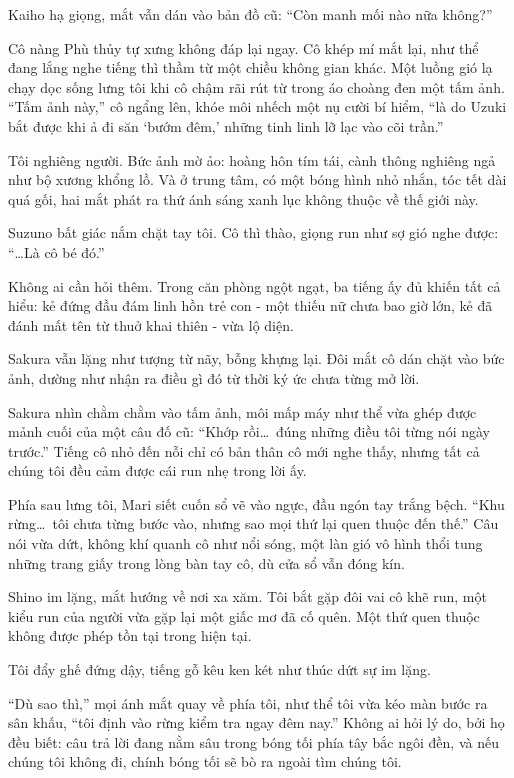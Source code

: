 \documentclass[../main.tex]{subfiles}
\begin{document}
Kaiho hạ giọng, mắt vẫn dán vào bản đồ cũ: ``Còn manh mối nào nữa không?''

Cô nàng Phù thủy tự xưng không đáp lại ngay. Cô khép mí mắt lại, như thể đang lắng nghe tiếng thì thầm từ một chiều không gian khác. Một luồng gió lạ chạy dọc sống lưng tôi khi cô chậm rãi rút từ trong áo choàng đen một tấm ảnh. ``Tấm ảnh này,'' cô ngẩng lên, khóe môi nhếch một nụ cười bí hiểm, ``là do Uzuki bắt được khi ả đi săn `bướm đêm,' những tinh linh lỡ lạc vào cõi trần.''

Tôi nghiêng người. Bức ảnh mờ ảo: hoàng hôn tím tái, cành thông nghiêng ngả như bộ xương khổng lồ. Và ở trung tâm, có một bóng hình nhỏ nhắn, tóc tết dài quá gối, hai mắt phát ra thứ ánh sáng xanh lục không thuộc về thế giới này.

Suzuno bất giác nắm chặt tay tôi. Cô thì thào, giọng run như sợ gió nghe được: ``\dots Là cô bé đó.''

Không ai cần hỏi thêm. Trong căn phòng ngột ngạt, ba tiếng ấy đủ khiến tất cả hiểu: kẻ đứng đầu đám linh hồn trẻ con - một thiếu nữ chưa bao giờ lớn, kẻ đã đánh mất tên từ thuở khai thiên - vừa lộ diện.

Sakura vẫn lặng như tượng từ nãy, bỗng khựng lại. Đôi mắt cô dán chặt vào bức ảnh, dường như nhận ra điều gì đó từ thời ký ức chưa từng mở lời.

Sakura nhìn chằm chằm vào tấm ảnh, môi mấp máy như thể vừa ghép được mảnh cuối của một câu đố cũ: ``Khớp rồi\dots\ đúng những điều tôi từng nói ngày trước.'' Tiếng cô nhỏ đến nỗi chỉ có bản thân cô mới nghe thấy, nhưng tất cả chúng tôi đều cảm được cái run nhẹ trong lời ấy.

Phía sau lưng tôi, Mari siết cuốn sổ vẽ vào ngực, đầu ngón tay trắng bệch. ``Khu rừng\dots\ tôi chưa từng bước vào, nhưng sao mọi thứ lại quen thuộc đến thế.'' Câu nói vừa dứt, không khí quanh cô như nổi sóng, một làn gió vô hình thổi tung những trang giấy trong lòng bàn tay cô, dù cửa sổ vẫn đóng kín.

Shino im lặng, mắt hướng về nơi xa xăm. Tôi bắt gặp đôi vai cô khẽ run, một kiểu run của người vừa gặp lại một giấc mơ đã cố quên. Một thứ quen thuộc không được phép tồn tại trong hiện tại.

Tôi đẩy ghế đứng dậy, tiếng gỗ kêu ken két như thúc dứt sự im lặng.

``Dù sao thì,'' mọi ánh mắt quay về phía tôi, như thể tôi vừa kéo màn bước ra sân khấu, ``tôi định vào rừng kiểm tra ngay đêm nay.'' Không ai hỏi lý do, bởi họ đều biết: câu trả lời đang nằm sâu trong bóng tối phía tây bắc ngôi đền, và nếu chúng tôi không đi, chính bóng tối sẽ bò ra ngoài tìm chúng tôi.
\end{document}
